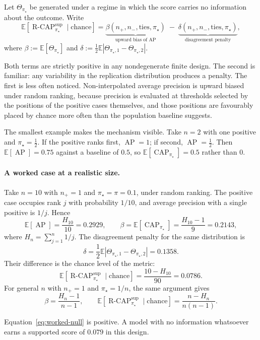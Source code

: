 \documentclass[11pt]{article}
\newcommand{\AP}{\operatorname{AP}}
\newcommand{\CAP}{\operatorname{CAP}}
\newcommand{\Tpi}{\CAP_{\pi_\star}}
\newcommand{\E}{\mathbb{E}}
\newcommand{\RCAP}{\operatorname{R\text{-}CAP}^{\mathrm{sup}}_{\pi_\star}}
\theoremstyle{remark}
\begin{document}
Let $\Theta_{\pi_\star}$ be generated under a regime in which the score carries no information about the outcome. Write
\begin{equation}
\E\!\left[\RCAP \mid \text{chance}\right]
=
\underbrace{\beta(n_+,n_-,\text{ties},\pi_\star)}_{\text{upward bias of }\AP}
\;-\;
\underbrace{\delta(n_+,n_-,\text{ties},\pi_\star)}_{\text{disagreement penalty}} ,
\label{eq:two-distortions}
\end{equation}
where $\beta:=\E[\Theta_{\pi_\star}]$ and $\delta:=\tfrac12\E|\Theta_{\pi_\star,1}-\Theta_{\pi_\star,2}|$.

Both terms are strictly positive in any nondegenerate finite design. The second is familiar: any variability in the replication distribution produces a penalty. The first is less often noticed. Non-interpolated average precision is upward biased under random ranking, because precision is evaluated at thresholds selected by the positions of the positive cases themselves, and those positions are favourably placed by chance more often than the population baseline suggests.

The smallest example makes the mechanism visible. Take $n=2$ with one positive and $\pi_\star=\tfrac12$. If the positive ranks first, $\AP=1$; if second, $\AP=\tfrac12$. Then $\E[\AP]=0.75$ against a baseline of $0.5$, so $\E[\Tpi]=0.5$ rather than $0$.

\paragraph{A worked case at a realistic size.}
Take $n=10$ with $n_+=1$ and $\pi_\star=\pi=0.1$, under random ranking. The positive case occupies rank $j$ with probability $1/10$, and average precision with a single positive is $1/j$. Hence
\[
\E[\AP]=\frac{H_{10}}{10}=0.2929,
\qquad
\beta=\E[\Tpi]=\frac{H_{10}-1}{9}=0.2143,
\]
where $H_{n}=\sum_{j=1}^{n}1/j$. The disagreement penalty for the same distribution is
\[
\delta
=
\frac{1}{2}\E\left|\Theta_{\pi_\star,1}-\Theta_{\pi_\star,2}\right|
=
0.1358 .
\]
Their difference is the chance level of the metric:
\begin{equation}
\E\!\left[\RCAP \mid \text{chance}\right]
=
\frac{10-H_{10}}{90}
=
0.0786 .
\label{eq:worked-null}
\end{equation}
For general $n$ with $n_+=1$ and $\pi_\star=1/n$, the same argument gives
\[
\beta=\frac{H_n-1}{n-1},
\qquad
\E\!\left[\RCAP\mid\text{chance}\right]=\frac{n-H_n}{n(n-1)} .
\]

Equation~\eqref{eq:worked-null} is positive. A model with no information whatsoever earns a supported score of $0.079$ in this design.
\end{document}
